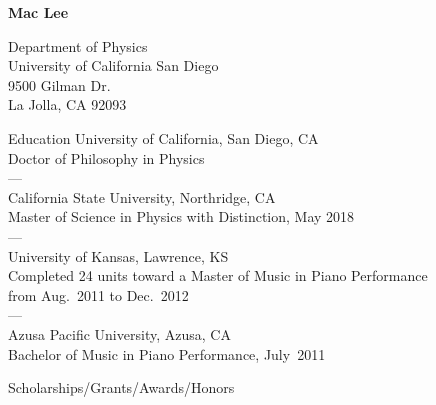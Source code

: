 \documentclass{cv}
\begin{document}
\centerline{\LARGE{\textbf{Mac Lee}}}
\vspace{11pt}
\begin{minipage}[t]{0.4\textwidth}
  Department of Physics\\
  University of California San Diego\\
  9500 Gilman Dr.\\
  La Jolla, CA 92093\\
\end{minipage}
\hfill
\begin{minipage}[t]{0.4\textwidth}
\end{minipage}

\begin{block}{Education}
  University of California, San Diego, CA\\
  Doctor of Philosophy in Physics\\
  ---\\
  California State University, Northridge, CA\\
  Master of Science in Physics with Distinction, May 2018\\
  ---\\
  University of Kansas, Lawrence, KS\\
  Completed 24 units toward a Master of Music in Piano Performance\\
  from Aug.~2011 to Dec.~2012\\
  ---\\
  Azusa Pacific University, Azusa, CA\\
  Bachelor of Music in Piano Performance, July~2011
\end{block}

\begin{block}{Scholarships/Grants/Awards/Honors}
  \begin{entries}
  \end{entries}
\end{block}
\end{document}
